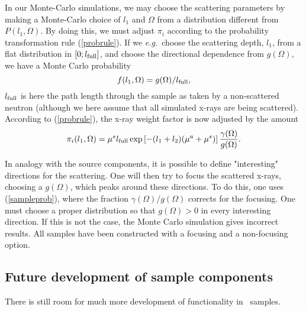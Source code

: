 In our Monte-Carlo simulations, we may choose the scattering
parameters by making a Monte-Carlo choice of $l_1$ and $\Omega$
from a distribution different from $P(l_1,\Omega)$.
By doing this, we must adjust $\pi_i$ according to
the probability transformation rule (\ref{probrule}).
If we {\em e.g.}\ choose the scattering depth, $l_1$,
from a flat distribution in $[ 0 ; l_{\rm full} ]$,
and choose the directional dependence from $g(\Omega)$,
we have a Monte Carlo probability
\begin{equation}
f(l_1,\Omega) = g(\Omega) / l_{\rm full} ,
\end{equation}
$l_{\rm full}$ is here the path length through the sample
as taken by a non-scattered neutron (although we here
assume that all simulated x-rays are being scattered).
According to (\ref{probrule}), the x-ray weight factor
is now adjusted by the amount
\begin{equation}     \label{sampleprob}
\pi_i(l_1,\Omega) =
 \mu^s l_{\rm full} \exp \left[ - (l_1+l_2) (\mu^a + \mu^s) \right]
  \frac{\gamma(\Omega)}{g(\Omega)} .
\end{equation}

In analogy with the source components, it is possible to define
"interesting" directions for the scattering.
One will then try to focus the scattered x-rays,
choosing a $g(\Omega)$, which peaks around these directions.
To do this, one uses (\ref{sampleprob}), where the
fraction $\gamma(\Omega)/g(\Omega)$ corrects for the focusing.
One must choose a proper distribution so that
$g(\Omega) > 0$ in every interesting direction. If this is not the
case, the Monte Carlo simulation gives incorrect results.
All samples have been constructed with a focusing
and a non-focusing option.


\subsection{Future development of sample components}
There is still room for much more development of functionality in
\MCX\ samples.



          \newpage
   \newpage
             \newpage
 \newpage
%
